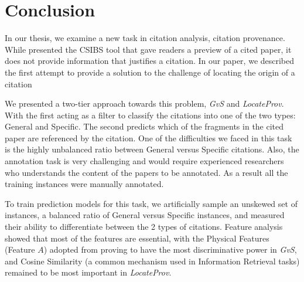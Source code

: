 \chapter{Conclusion}
\label{conclusion}
In our thesis, we examine a new task in citation analysis, citation provenance. While  presented the CSIBS tool that gave readers a preview of a cited paper, it does not provide information that justifies a citation. In our paper, we described the first attempt to provide a solution to the challenge of locating the origin of a citation

We presented a two-tier approach towards this problem, {\it GvS} and {\it LocateProv}. With the first acting as a filter to classify the citations into one of the two types: General and Specific. The second predicts which of the fragments in the cited paper are referenced by the citation. One of the difficulties we faced in this task is the highly unbalanced ratio between General versus Specific citations. Also, the annotation task is very challenging and would require experienced researchers who understands the content of the papers to be annotated. As a result all the training instances were manually annotated.
%

To train prediction models for this task, we artificially sample an unskewed set of instances, a balanced ratio of General versus Specific instances, and measured their ability to differentiate between the 2 types of citations. Feature analysis showed that most of the features are essential, with the Physical Features (Feature $A$) adopted from  proving to have the most discriminative power in {\it GvS}, and Cosine Similarity (a common mechanism used in Information Retrieval tasks) remained to be most important in {\it LocateProv}.

